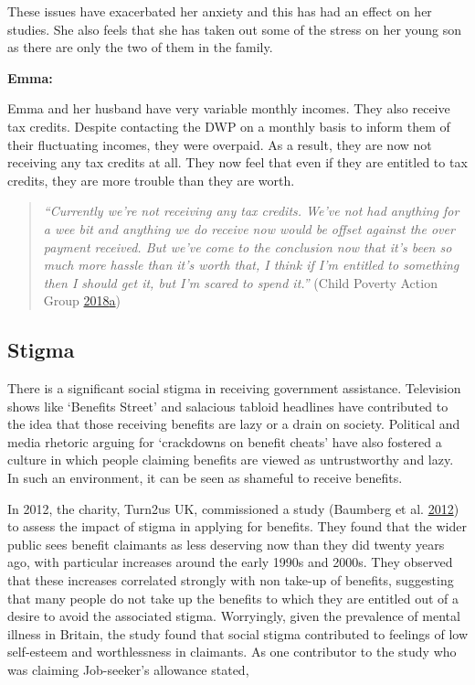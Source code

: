 \documentclass[]{tufte-handout}
\begin{document}
These issues have exacerbated her anxiety and this has had an effect on
her studies. She also feels that she has taken out some of the stress on
her young son as there are only the two of them in the family.

\textbf{Emma: }

Emma and her husband have very variable monthly incomes. They also
receive tax credits. Despite contacting the DWP on a monthly basis to
inform them of their fluctuating incomes, they were overpaid. As a
result, they are now not receiving any tax credits at all. They now feel
that even if they are entitled to tax credits, they are more trouble
than they are worth.

\begin{quote}
\emph{``Currently we're not receiving any tax credits. We've not had
anything for a wee bit and anything we do receive now would be offset
against the over payment received. But we've come to the conclusion now
that it's been so much more hassle than it's worth that, I think if I'm
entitled to something then I should get it, but I'm scared to spend
it.''} (Child Poverty Action Group
\protect\hyperlink{ref-ChildPovertyActionGroupb}{2018}\protect\hyperlink{ref-ChildPovertyActionGroupb}{a})
\end{quote}

\hypertarget{stigma}{%
\subsection{Stigma}\label{stigma}}

There is a significant social stigma in receiving government assistance.
Television shows like `Benefits Street' and salacious tabloid headlines
have contributed to the idea that those receiving benefits are lazy or a
drain on society. Political and media rhetoric arguing for `crackdowns
on benefit cheats' have also fostered a culture in which people claiming
benefits are viewed as untrustworthy and lazy. In such an environment,
it can be seen as shameful to receive benefits.

In 2012, the charity, Turn2us UK, commissioned a study (Baumberg et al.
\protect\hyperlink{ref-Baumberg2012}{2012}) to assess the impact of
stigma in applying for benefits. They found that the wider public sees
benefit claimants as less deserving now than they did twenty years ago,
with particular increases around the early 1990s and 2000s. They
observed that these increases correlated strongly with non take-up of
benefits, suggesting that many people do not take up the benefits to
which they are entitled out of a desire to avoid the associated stigma.
Worryingly, given the prevalence of mental illness in Britain, the study
found that social stigma contributed to feelings of low self-esteem and
worthlessness in claimants. As one contributor to the study who was
claiming Job-seeker's allowance stated,
\end{document}
